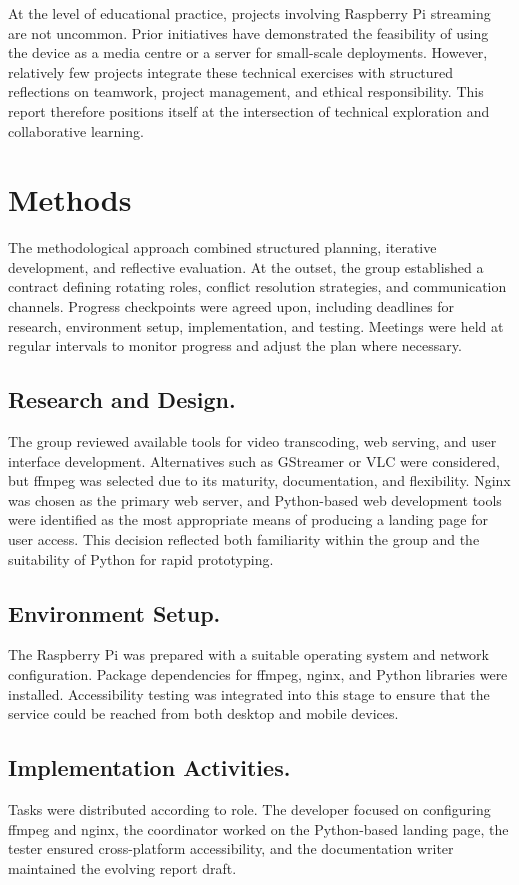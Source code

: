 \documentclass[11pt]{report}
\begin{document}
At the level of educational practice, projects involving Raspberry Pi streaming are not uncommon. Prior initiatives have demonstrated the feasibility of using the device as a media centre or a server for small-scale deployments. However, relatively few projects integrate these technical exercises with structured reflections on teamwork, project management, and ethical responsibility. This report therefore positions itself at the intersection of technical exploration and collaborative learning.

\chapter{Methods}
The methodological approach combined structured planning, iterative development, and reflective evaluation. At the outset, the group established a contract defining rotating roles, conflict resolution strategies, and communication channels. Progress checkpoints were agreed upon, including deadlines for research, environment setup, implementation, and testing. Meetings were held at regular intervals to monitor progress and adjust the plan where necessary.

\section{Research and Design.} The group reviewed available tools for video transcoding, web serving, and user interface development. Alternatives such as GStreamer or VLC were considered, but ffmpeg was selected due to its maturity, documentation, and flexibility. Nginx was chosen as the primary web server, and Python-based web development tools were identified as the most appropriate means of producing a landing page for user access. This decision reflected both familiarity within the group and the suitability of Python for rapid prototyping.

\section{Environment Setup.} The Raspberry Pi was prepared with a suitable operating system and network configuration. Package dependencies for ffmpeg, nginx, and Python libraries were installed. Accessibility testing was integrated into this stage to ensure that the service could be reached from both desktop and mobile devices.

\section{Implementation Activities.} Tasks were distributed according to role. The developer focused on configuring ffmpeg and nginx, the coordinator worked on the Python-based landing page, the tester ensured cross-platform accessibility, and the documentation writer maintained the evolving report draft.
\end{document}
